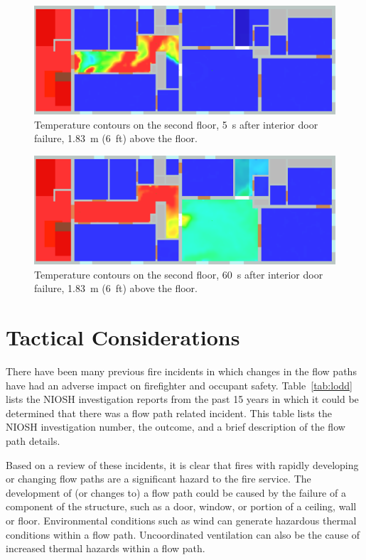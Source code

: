 \documentclass[12pt,oneside]{book}
\begin{document}
\begin{figure}[!ht]
\centering
\includegraphics[width=.68\textwidth]{../Figures/west_50th_baseline_top_165_6ft}
 

\caption[Temperature contours on the second floor, 5~s after interior door failure.]
{Temperature contours on the second floor, 5~s after interior door failure, 1.83~m (6~ft) above the floor.}
\label{fig:temp_top_165}
\end{figure}

\begin{figure}[!ht]
\centering
\includegraphics[width=.68\textwidth]{../Figures/west_50th_baseline_top_220_6ft}
 

\caption[Temperature contours on the second floor, 60~s after interior door failure.]
{Temperature contours on the second floor, 60~s after interior door failure, 1.83~m (6~ft) above the floor.}
\label{fig:temp_top_220}
\end{figure}


\section{Tactical Considerations}
There have been many previous fire incidents in which changes in the flow paths have had an adverse impact on firefighter and occupant safety. Table~\ref{tab:lodd} lists the NIOSH investigation reports from the past 15 years in which it could be determined that there was a flow path related incident. This table lists the NIOSH investigation number, the outcome, and a brief description of the flow path details.

Based on a review of these incidents, it is clear that fires with rapidly developing or changing flow paths are a significant hazard to the fire service. The development of (or changes to) a flow path could be caused by the failure of a component of the structure, such as a door, window, or portion of a ceiling, wall or floor. Environmental conditions such as wind can generate hazardous thermal conditions within a flow path. Uncoordinated ventilation can also be the cause of increased thermal hazards within a flow path. 
\end{document}
